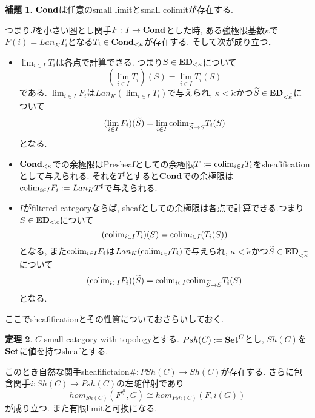 \documentclass[dvipdfmx,a4paper,11pt]{article}
\newcommand{\colim}{{\rm colim}}
\theoremstyle{definition}
\newtheorem{thm}{定理}
\newtheorem{lem}[thm]{補題}
\newcommand{\xr}[1]{\textcolor{red}{#1}}
\begin{document}
\begin{tcolorbox}
 [colback = white, colframe = green!35!black, fonttitle = \bfseries,breakable = true]
\begin{lem}\cite[Remark 2.13]{Sch19}
\label{cor-Sch19-rem2.13}
${\bf Cond}$は任意のsmall limitとsmall colimitが存在する.

つまり$J$を小さい圏とし関手$F : I \to {\bf Cond}$とした時, 
ある強極限基数$\kappa$で$F(i) = Lan_{K}T_i$となる$T_i \in {\bf Cond_{<\kappa}}$が存在する.
そして次が成り立つ． 
\begin{itemize}
\item $\lim_{i \in I} T_i$は各点で計算できる.
つまり$S \in { \bf ED}_{< \kappa}$について
$$(\lim_{i \in I} T_i)(S)= \lim_{i \in I} T_i(S)$$である. $\lim_{i \in I}F_i$は$Lan_{K}(\lim_{i \in I} T_i)$で与えられ, $\kappa <\widetilde{\kappa}$かつ$\widetilde{S} \in { \bf ED}_{<\widetilde{\kappa}}$について
$$
(\lim_{i \in I}F_i)(\widetilde{S})
=  \lim_{i \in I} \colim_{\widetilde{S} \to S}  T_i(S)
$$
となる. 
\item ${\bf Cond_{<\kappa}}$での余極限はPresheafとしての余極限$T:=\colim_{i \in I} T_i$をsheafificationとして与えられる. 
それを$T^{\sharp}$とすると${\bf Cond}$での余極限は
$\colim_{i \in I}F_i := Lan_{K}T^{\sharp}$で与えられる. 
\item $I$がfiltered categoryならば, sheafとしての余極限は各点で計算できる.つまり$S \in { \bf ED}_{< \kappa}$について
$$(\colim_{i \in I} T_i)(S) = \colim_{i \in I} (T_i(S))$$
となる, また$\colim_{i \in I}F_i$は$Lan_{K}(\colim_{i \in I} T_i)$で与えられ, 
$\kappa <\widetilde{\kappa}$かつ$\widetilde{S} \in { \bf ED}_{<\widetilde{\kappa}}$について
$$
(\colim_{i \in I}F_i)(\widetilde{S})
=\colim_{i \in I}\colim_{\widetilde{S} \to S}  T_i(S)
$$
となる. 
\end{itemize}
\end{lem}
 \end{tcolorbox}
 
 ここでsheafificationとその性質についておさらいしておく. 
  \begin{tcolorbox}
 [colback = white, colframe = green!35!black, fonttitle = \bfseries,breakable = true]
 \begin{thm}\cite{Sha2}
 $C$ small category with topologyとする. 
 $Psh(C) :={\bf Set}^{C}$とし, $Sh(C)$を${\bf Set}$に値を持つsheafとする.
 
 このとき自然な関手sheafifictaion$\# : PSh(C) \to Sh(C)$が存在する.
 さらに包含関手$i : Sh(C) \to Psh(C)$の左随伴射であり
 $$
hom_{Sh(C)}(F^{\#}, G) \cong hom_{Psh(C)}(F, i(G)) 
 $$
 が成り立つ. また有限limitと可換になる.
 \end{thm}
 \end{tcolorbox}
 
\end{document}
